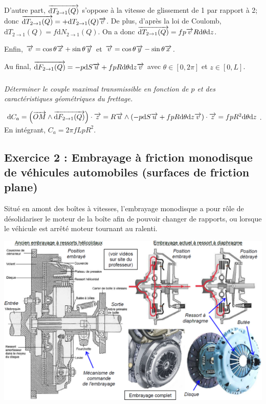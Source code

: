 \documentclass[10pt,fleqn]{article} %
\begin{document}
\begin{multicols}{2}
\begin{multicols}{2}
\begin{corrige}
D'autre part, $\overrightarrow{\text{d}T_{2\rightarrow 1}(Q)}$ s'oppose à la vitesse de glissement de 1 par rapport à 2; donc $\overrightarrow{\text{d}T_{2\rightarrow 1}(Q)}=+\text{d}T_{2\rightarrow 1}(Q)\overrightarrow{v}$. De plus, d'après la loi de Coulomb, $\text{d}T_{2\rightarrow 1}(Q)=f\text{d}N_{2\rightarrow 1}(Q)$. On a donc $\overrightarrow{\text{d}T_{2\rightarrow 1}(Q)}=fp\overrightarrow{v} R\text{d}\theta \text{d} z$. 

Enfin, $\overrightarrow{v}=\cos\theta\overrightarrow{x}+\sin\theta\overrightarrow{y}$ et $\overrightarrow{v}=\cos\theta\overrightarrow{y}-\sin\theta\overrightarrow{x}$.

Au final, $\overrightarrow{\text{d}F_{2\rightarrow 1}(Q)}=-p\text{d}S\overrightarrow{u}+fp R\text{d}\theta \text{d} z \overrightarrow{v}$ avec $\theta\in[0,2\pi]$ et $z\in[0,L]$.
\end{corrige}
\else
\fi


\subparagraph{}
\textit{Déterminer le couple maximal transmissible en fonction de $p$ et des 
caractéristiques géométriques du frettage.}

\ifprof
\begin{corrige}
$\text{d} C_a = \left(\overrightarrow{OM}\wedge\overrightarrow{\text{d}F_{2\rightarrow 1}(Q)}\right) \cdot \overrightarrow{z}
=R\overrightarrow{u}\wedge \left( -p\text{d}S\overrightarrow{u}+fp R\text{d}\theta \text{d} z \overrightarrow{v}\right)\cdot \overrightarrow{z}
=fp R^2\text{d}\theta \text{d} z $. En intégrant,  $C_a = 2\pi fLp R^2$.
\end{corrige}
\else
\fi

\subsection*{Exercice 2 : Embrayage à friction monodisque de véhicules automobiles (surfaces de friction plane)}
\setcounter{exo}{0}
Situé en amont des boîtes à vitesses, l'embrayage monodisque a pour rôle de désolidariser le moteur de la 
boîte afin de pouvoir changer de rapports, ou lorsque le véhicule est arrêté moteur tournant au ralenti. 

\begin{center}
\includegraphics[width=.9\linewidth]{images/fig_06}
\end{center}


\end{multicols}
\end{multicols}
\end{document}
